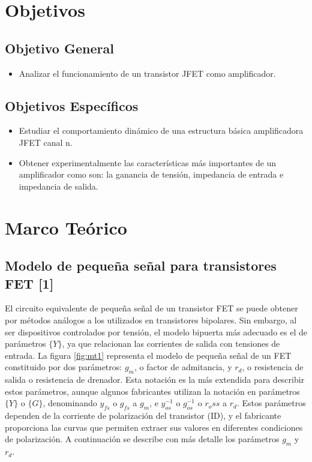 \documentclass[12pt, a4paper]{article}
\begin{document}
    \newpage

    \section{Objetivos}

    \subsection{Objetivo General}
    \begin{itemize}
        \item Analizar el funcionamiento de un transistor JFET como amplificador.
    \end{itemize}

    \subsection{Objetivos Específicos}
    \begin{itemize}
        \item Estudiar el comportamiento dinámico de una estructura básica amplificadora JFET canal n.
        \item Obtener experimentalmente las características más importantes de un amplificador como son: la ganancia de tensión, impedancia de entrada e impedancia de salida.
    \end{itemize}

    \newpage

    \section{Marco Teórico}

    \subsection{Modelo de pequeña señal para transistores FET [1]}

    El circuito equivalente de pequeña señal de un transistor FET se puede obtener por métodos análogos a los utilizados en transistores bipolares. Sin embargo, al ser dispositivos controlados por tensión, el modelo bipuerta más adecuado es el de parámetros $\{Y\}$, ya que relacionan las corrientes de salida con tensiones de entrada. La figura \ref{fig:mt1} representa el modelo de pequeña señal de un FET constituido por dos parámetros: $g_m$, o factor de admitancia, y $r_d$, o resistencia de salida o resistencia de drenador. Esta notación es la más extendida para describir estos parámetros, aunque algunos fabricantes utilizan la notación en parámetros $\{Y\}$ o $\{G\}$, denominando $y_{fs}$ o $g_{fs}$ a $g_m$, e $y_{os}^{-1}$ o $g_{os}^{-1}$ o $r_oss$ a $r_d$. Estos parámetros dependen de la corriente de polarización del transistor (ID), y el fabricante proporciona las curvas que permiten extraer sus valores en diferentes condiciones de polarización. A continuación se describe con más detalle los parámetros $g_m$ y $r_d$.
\end{document}
